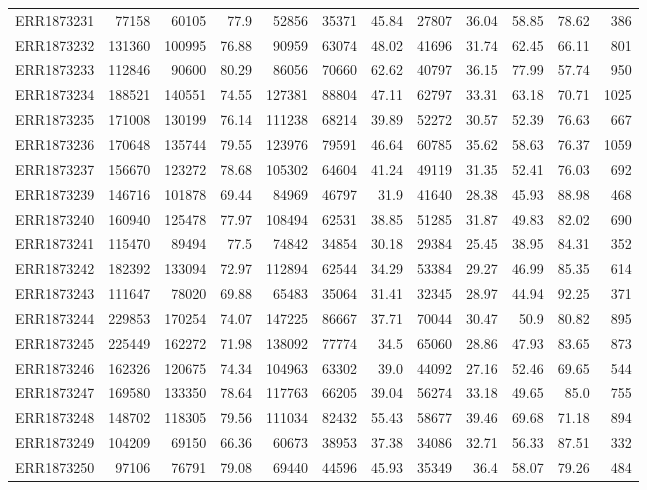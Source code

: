 \documentclass[12pt, oneside]{report}
\begin{document}
\begin{longtable}{@{}p{3.2cm}rrrrrrrrrrr@{}}
ERR1873231 & 77158 & 60105 & 77.9 & 52856 & 35371 & 45.84 & 27807 & 36.04 & 58.85 & 78.62 & 386 \\
ERR1873232 & 131360 & 100995 & 76.88 & 90959 & 63074 & 48.02 & 41696 & 31.74 & 62.45 & 66.11 & 801 \\
ERR1873233 & 112846 & 90600 & 80.29 & 86056 & 70660 & 62.62 & 40797 & 36.15 & 77.99 & 57.74 & 950 \\
ERR1873234 & 188521 & 140551 & 74.55 & 127381 & 88804 & 47.11 & 62797 & 33.31 & 63.18 & 70.71 & 1025 \\
ERR1873235 & 171008 & 130199 & 76.14 & 111238 & 68214 & 39.89 & 52272 & 30.57 & 52.39 & 76.63 & 667 \\
ERR1873236 & 170648 & 135744 & 79.55 & 123976 & 79591 & 46.64 & 60785 & 35.62 & 58.63 & 76.37 & 1059 \\
ERR1873237 & 156670 & 123272 & 78.68 & 105302 & 64604 & 41.24 & 49119 & 31.35 & 52.41 & 76.03 & 692 \\
ERR1873239 & 146716 & 101878 & 69.44 & 84969 & 46797 & 31.9 & 41640 & 28.38 & 45.93 & 88.98 & 468 \\
ERR1873240 & 160940 & 125478 & 77.97 & 108494 & 62531 & 38.85 & 51285 & 31.87 & 49.83 & 82.02 & 690 \\
ERR1873241 & 115470 & 89494 & 77.5 & 74842 & 34854 & 30.18 & 29384 & 25.45 & 38.95 & 84.31 & 352 \\
ERR1873242 & 182392 & 133094 & 72.97 & 112894 & 62544 & 34.29 & 53384 & 29.27 & 46.99 & 85.35 & 614 \\
ERR1873243 & 111647 & 78020 & 69.88 & 65483 & 35064 & 31.41 & 32345 & 28.97 & 44.94 & 92.25 & 371 \\
ERR1873244 & 229853 & 170254 & 74.07 & 147225 & 86667 & 37.71 & 70044 & 30.47 & 50.9 & 80.82 & 895 \\
ERR1873245 & 225449 & 162272 & 71.98 & 138092 & 77774 & 34.5 & 65060 & 28.86 & 47.93 & 83.65 & 873 \\
ERR1873246 & 162326 & 120675 & 74.34 & 104963 & 63302 & 39.0 & 44092 & 27.16 & 52.46 & 69.65 & 544 \\
ERR1873247 & 169580 & 133350 & 78.64 & 117763 & 66205 & 39.04 & 56274 & 33.18 & 49.65 & 85.0 & 755 \\
ERR1873248 & 148702 & 118305 & 79.56 & 111034 & 82432 & 55.43 & 58677 & 39.46 & 69.68 & 71.18 & 894 \\
ERR1873249 & 104209 & 69150 & 66.36 & 60673 & 38953 & 37.38 & 34086 & 32.71 & 56.33 & 87.51 & 332 \\
ERR1873250 & 97106 & 76791 & 79.08 & 69440 & 44596 & 45.93 & 35349 & 36.4 & 58.07 & 79.26 & 484 \\

\end{longtable}
\end{document}
